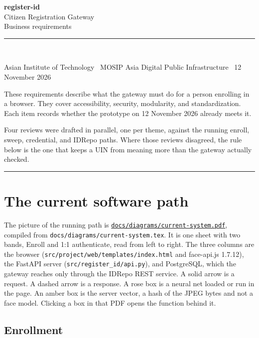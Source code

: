 \documentclass[11pt]{article}
\begin{document}
\color{ink}

{\sffamily\bfseries\LARGE\color{green} register-id}\\[0.25em]
{\sffamily\Large Citizen Registration Gateway}\\[0.15em]
{\sffamily\large Business requirements}\\[0.7em]
{\color{rule}\rule{\textwidth}{1.1pt}}\\[0.55em]
{\small\color{muted}
Asian Institute of Technology \textperiodcentered\
MOSIP Asia Digital Public Infrastructure \textperiodcentered\
12 November 2026\par
}
\vspace{0.4em}

\noindent
These requirements describe what the gateway must do for a person enrolling in a browser. They cover accessibility, security, modularity, and standardization. Each item records whether the prototype on 12 November 2026 already meets it.

\vspace{0.35em}
\noindent
Four reviews were drafted in parallel, one per theme, against the running enroll, sweep, credential, and IDRepo paths. Where those reviews disagreed, the rule below is the one that keeps a UIN from meaning more than the gateway actually checked.

\tableofcontents
\vspace{0.6em}
{\color{rule}\rule{\textwidth}{0.4pt}}

\section{The current software path}

The picture of the running path is \href{diagrams/current-system.pdf}{\texttt{docs/diagrams/current-system.pdf}}, compiled from \texttt{docs/diagrams/current-system.tex}. It is one sheet with two bands, Enroll and 1:1 authenticate, read from left to right. The three columns are the browser (\texttt{src/project/web/templates/index.html} and face-api.js 1.7.12), the FastAPI server (\texttt{src/register\_id/api.py}), and PostgreSQL, which the gateway reaches only through the IDRepo REST service. A solid arrow is a request. A dashed arrow is a response. A rose box is a neural net loaded or run in the page. An amber box is the server vector, a hash of the JPEG bytes and not a face model. Clicking a box in that PDF opens the function behind it.

\subsection{Enrollment}
\end{document}
